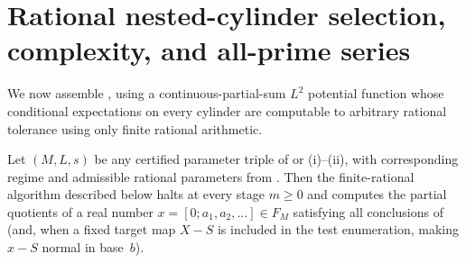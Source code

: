 \documentclass[11pt]{article}
\begin{document}
\section{Rational nested-cylinder selection, complexity, and all-prime series}\label{sec:selection}

We now assemble , using a continuous-partial-sum $L^2$ potential function whose conditional expectations on every cylinder are computable to arbitrary rational tolerance using only finite rational arithmetic.

\begin{theorem}\label{thm:selection}
Let $(M,L,s)$ be any certified parameter triple of  or (i)--(ii), with corresponding regime and admissible rational parameters from . Then the finite-rational algorithm described below halts at every stage $m\ge0$ and computes the partial quotients of a real number $x=[0;a_1,a_2,\dots]\in F_M$ satisfying all conclusions of  (and, when a fixed target map $X-S$ is included in the test enumeration, making $x-S$ normal in base~$b$).
\end{theorem}
\end{document}

